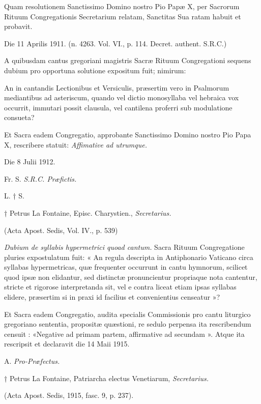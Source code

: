 \documentclass[vesperale_romanum.tex]{subfiles}
\begin{document}
Quam resolutionem San\-ctissimo Domino nostro Pio Papæ X, per Sacrorum Rituum Congregationis Secretarium relatam, San\-ctitas Sua ratam habuit et probavit.

Die 11 Aprilis 1911. {\hfill(n. 4263. Vol. VI., p. 114. Decret. authent. S.R.C.)}
\vspace{5ex}%

{\centering{}\par} %

{}

A quibusdam cantus gregoriani magistris Sacræ Rituum Congregationi sequens dubium pro opportuna solutione expositum fuit; nimirum:

An in cantandis Le\-ctionibus et Versiculis, præsertim vero in Psalmorum mediantibus ad asteriscum, quando vel di\-ctio monosyllaba vel hebraica vox occurrit, immutari possit clausula, vel cantilena proferri sub modulatione consueta?

Et Sacra eadem Congregatio, approbante San\-ctissimo Domino nostro Pio Papa X, rescribere statuit: \textit{Affimative ad utrumque.}

Die 8 Julii 1912.

\hfill{Fr. S.  \textit{S.R.C. Præfi\-ctis.}}

L. † S.

{\hfill † Petrus La Fontaine, Episc. Charystien., \textit{Secretarius.}}

(A\-cta Apost. Sedis, Vol. IV., p. 539)
\vspace{5ex}%

{\centering{}\par} %

{}

\textit{Dubium de syllabis hypermetrici quoad cantum.} Sacra Rituum Congregatione pluries expostulatum fuit: « An regula descripta in Antiphonario Vaticano circa syllabas hypermetricas, quæ frequenter occurrunt in cantu hymnorum, scilicet quod ipsæ non elidantur, sed distin\-ctæ pronuncientur propriaque nota cantentur, stri\-cte et rigorose interpretanda sit, vel e contra liceat etiam ipsas syllabas elidere, præsertim si in praxi id facilius et convenientius censeatur »?

Et Sacra eadem Congregatio, audita specialis Commissionis pro cantu liturgico gregoriano sententia, propositæ quæstioni, re sedulo perpensa ita rescribendum censuit : «Negative ad primam partem, affirmative ad secundam ». Atque ita rescripsit et declaravit die 14 Maii 1915.

\hfill{A.   \textit{Pro-Præfe\-ctus.}}

{\hfill† Petrus La Fontaine, Patriarcha ele\-ctus Venetiarum, \textit{Secretarius.}}

(Acta Apost. Sedis, 1915, fasc. 9, p. 237).
\end{document}
